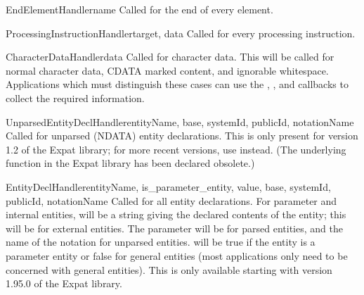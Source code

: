 \begin{methoddesc}[xmlparser]{EndElementHandler}{name}
Called for the end of every element.
\end{methoddesc}

\begin{methoddesc}[xmlparser]{ProcessingInstructionHandler}{target, data}
Called for every processing instruction.
\end{methoddesc}

\begin{methoddesc}[xmlparser]{CharacterDataHandler}{data}
Called for character data.  This will be called for normal character
data, CDATA marked content, and ignorable whitespace.  Applications
which must distinguish these cases can use the
, ,
and  callbacks to collect the required
information.
\end{methoddesc}

\begin{methoddesc}[xmlparser]{UnparsedEntityDeclHandler}{entityName, base,
                                                         systemId, publicId,
                                                         notationName}
Called for unparsed (NDATA) entity declarations.  This is only present
for version 1.2 of the Expat library; for more recent versions, use
 instead.  (The underlying function in the
Expat library has been declared obsolete.)
\end{methoddesc}

\begin{methoddesc}[xmlparser]{EntityDeclHandler}{entityName,
                                                 is_parameter_entity, value,
                                                 base, systemId,
                                                 publicId,
                                                 notationName}
Called for all entity declarations.  For parameter and internal
entities,  will be a string giving the declared contents
of the entity; this will be  for external entities.  The
 parameter will be  for parsed entities,
and the name of the notation for unparsed entities.
 will be true if the entity is a parameter
entity or false for general entities (most applications only need to
be concerned with general entities).
This is only available starting with version 1.95.0 of the Expat
library.
\end{methoddesc}

